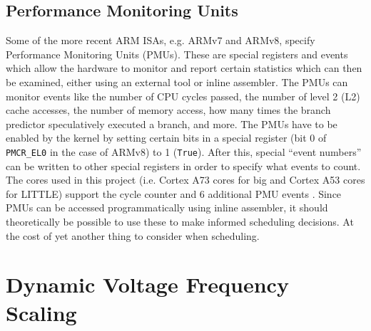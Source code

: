     \subsection{Performance Monitoring Units}
    Some of the more recent ARM ISAs, e.g. ARMv7 and ARMv8, specify Performance
    Monitoring Units (PMUs). These are special registers and events which allow
    the hardware to monitor and report certain statistics which can then be
    examined, either using an external tool or inline assembler. The PMUs can
    monitor events like the number of CPU cycles passed, the number of level 2
    (L2) cache accesses, the number of memory access, how many times the branch
    predictor speculatively executed a branch, and more. The PMUs have to be
    enabled by the kernel by setting certain bits in a special register (bit 0
    of \texttt{PMCR\_EL0} in the case of ARMv8) to 1 (\texttt{True}). After
    this, special ``event numbers'' can be written to other special registers in
    order to specify what events to count. The cores used in this project (i.e.
    Cortex A73 cores for big and Cortex A53 cores for LITTLE) support the cycle
    counter and 6 additional PMU events
    \cite{noauthor_arm_2015,noauthor_arm_2016}. Since PMUs can be accessed
    programmatically using inline assembler, it should theoretically be possible
    to use these to make informed scheduling decisions. At the cost of yet
    another thing to consider when scheduling.

\section{Dynamic Voltage Frequency Scaling}
